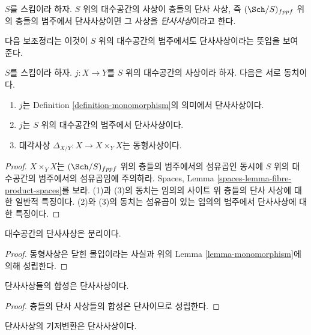 \begin{definition}
\label{definition-monomorphism}
$S$를 스킴이라 하자.
$S$ 위의 대수공간의 사상이 층들의 단사 사상, 즉
$(\Sch/S)_{fppf}$ 위의 층들의 범주에서 단사사상이면
그 사상을 {\it 단사사상}이라고 한다.
\end{definition}

\noindent
다음 보조정리는 이것이 $S$ 위의 대수공간의 범주에서도
단사사상이라는 뜻임을 보여 준다.

\begin{lemma}
\label{lemma-monomorphism}
$S$를 스킴이라 하자.
$j : X \to Y$를 $S$ 위의 대수공간의 사상이라 하자.
다음은 서로 동치이다.
\begin{enumerate}
\item $j$는 Definition \ref{definition-monomorphism}의 의미에서
단사사상이다.
\item $j$는 $S$ 위의 대수공간의 범주에서 단사사상이다.
\item 대각사상 $\Delta_{X/Y} : X \to X \times_Y X$는 동형사상이다.
\end{enumerate}
\end{lemma}

\begin{proof}
$X \times_Y X$는 $(\Sch/S)_{fppf}$ 위의 층들의 범주에서의 섬유곱인
동시에 $S$ 위의 대수공간의 범주에서의 섬유곱임에 주의하라.
Spaces, Lemma \ref{spaces-lemma-fibre-product-spaces}를 보라.
(1)과 (3)의 동치는 임의의 사이트 위 층들의 단사 사상에 대한
일반적 특징이다. (2)와 (3)의 동치는 섬유곱이 있는 임의의 범주에서
단사사상에 대한 특징이다.
\end{proof}

\begin{lemma}
\label{lemma-monomorphism-separated}
대수공간의 단사사상은 분리이다.
\end{lemma}

\begin{proof}
동형사상은 닫힌 몰입이라는 사실과 위의
Lemma \ref{lemma-monomorphism}에 의해 성립한다.
\end{proof}

\begin{lemma}
\label{lemma-composition-monomorphism}
단사사상들의 합성은 단사사상이다.
\end{lemma}

\begin{proof}
층들의 단사 사상들의 합성은 단사이므로 성립한다.
\end{proof}

\begin{lemma}
\label{lemma-base-change-monomorphism}
단사사상의 기저변환은 단사사상이다.
\end{lemma}

